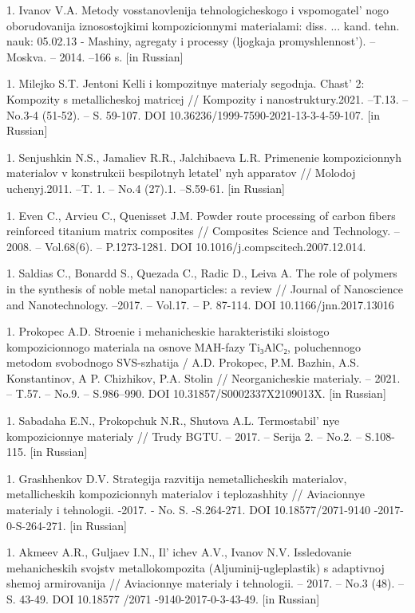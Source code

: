 1. Ivanov V.A. Metody vosstanovlenija tehnologicheskogo i
vspomogatel' nogo oborudovanija iznosostojkimi
kompozicionnymi materialami: diss. ... kand. tehn. nauk: 05.02.13 -
Mashiny, agregaty i processy (ljogkaja
promyshlennost'). -- Moskva. -- 2014. --166 s. {[}in
Russian{]}

1. Milejko S.T. Jentoni Kelli i kompozitnye materialy segodnja.
Chast'{} 2: Kompozity s metallicheskoj matricej //
Kompozity i nanostruktury.2021. --T.13. -- No.3-4 (51-52). -- S.
59-107. DOI 10.36236/1999-7590-2021-13-3-4-59-107. {[}in Russian{]}

1. Senjushkin N.S., Jamaliev R.R., Jalchibaeva L.R. Primenenie
kompozicionnyh materialov v konstrukcii bespilotnyh
letatel' nyh apparatov // Molodoj uchenyj.2011. --T.
1. -- No.4 (27).1. --S.59-61. {[}in Russian{]}

1. Even C., Arvieu C., Quenisset J.M. Powder route processing of carbon
fibers reinforced titanium matrix composites // Composites Science and
Technology. -- 2008. -- Vol.68(6). -- P.1273-1281. DOI
10.1016/j.compscitech.2007.12.014.

1. Saldias C., Bonardd S., Quezada C., Radic D., Leiva A. The role of
polymers in the synthesis of noble metal nanoparticles: a review //
Journal of Nanoscience and Nanotechnology. --2017. -- Vol.17. -- P.
87-114. DOI 10.1166/jnn.2017.13016

1. Prokopec A.D. Stroenie i mehanicheskie harakteristiki sloistogo
kompozicionnogo materiala na osnove MAH-fazy Ti₃AlC₂, poluchennogo
metodom svobodnogo SVS-szhatija / A.D. Prokopec, P.M. Bazhin, A.S.
Konstantinov, A P. Chizhikov, P.A. Stolin // Neorganicheskie
materialy. -- 2021. -- T.57. -- No.9. -- S.986--990. DOI
10.31857/S0002337X2109013X. {[}in Russian{]}

1. Sabadaha E.N., Prokopchuk N.R., Shutova A.L.
Termostabil' nye kompozicionnye materialy // Trudy
BGTU. -- 2017. -- Serija 2. -- No.2. -- S.108-115. {[}in Russian{]}

1. Grashhenkov D.V. Strategija razvitija nemetallicheskih materialov,
metallicheskih kompozicionnyh materialov i teplozashhity //
Aviacionnye materialy i tehnologii. -2017. - No. S. -S.264-271. DOI
10.18577/2071-9140 -2017-0-S-264-271. {[}in Russian{]}

1. Akmeev A.R., Guljaev I.N., Il' ichev A.V., Ivanov N.V.
Issledovanie mehanicheskih svojstv metallokompozita
(Aljuminij-ugleplastik) s adaptivnoj shemoj armirovanija //
Aviacionnye materialy i tehnologii. -- 2017. -- No.3 (48). -- S.
43-49. DOI 10.18577 /2071 -9140-2017-0-3-43-49. {[}in Russian{]}

